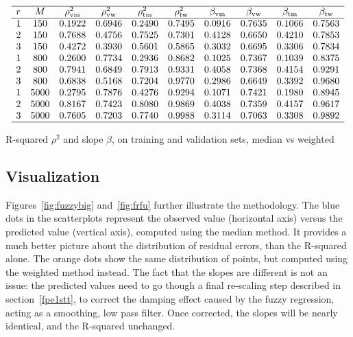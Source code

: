 \documentclass[oneside,10pt]{book}
\begin{document}
\begin{table}[H]
\small
\[
\begin{array}{lccccccccc}
\hline
  r & M & \rho^2_{\text{vm}}  & \rho^2_{\text{vw}} & \rho^2_{\text{tm}}  & \rho^2_{\text{tw}} & \beta_{\text{vm}} & \beta_{\text{vw}} & \beta_{\text{tm}} & \beta_{\text{tw}}\\
\hline
1	&	150	&	0.1922	&	0.6946	&	0.2490	&	0.7495	 & 0.0916 & 0.7635 & 0.1066 & 0.7563\\
2	&	150	&	0.7688	&	0.4756	&	0.7525	&	0.7301	 & 0.4128 & 0.6650 & 0.4210 & 0.7853\\
3	&	150	&	0.4272	&	0.3930	&	0.5601	&	0.5865	 & 0.3032 & 0.6695 & 0.3306 & 0.7834\\
1	&	800	&	0.2600	&	0.7734	&	0.2936	&	0.8682	 & 0.1025 & 0.7367 & 0.1039 & 0.8375\\
2	&	800	&	0.7941	&	0.6849	&	0.7913	&	0.9331	 & 0.4058 & 0.7368 & 0.4154 & 0.9291\\
3	&	800	&	0.6838	&	0.5168	&	0.7204	&	0.9770	 & 0.2986 & 0.6649 & 0.3392 & 0.9680\\
1	&	5000	&	0.2795	&	0.7876	&	0.4276	&	0.9294	 & 0.1071 & 0.7421 & 0.1980 & 0.8945\\
2	&	5000	&	0.8167	&	0.7423	&	0.8080	&	0.9869	 & 0.4038 & 0.7359 & 0.4157 & 0.9617\\
3	&	5000	&	0.7605	&	0.7203	&	0.7740	&	0.9988	 & 0.3114 & 0.7063 & 0.3308 & 0.9892\\
\hline
\end{array}
\]
\caption{\label{futabcorrel}R-squared $\rho^2$ and slope $\beta$, on training and validation sets, median vs weighted}
\end{table}

\subsection{Visualization}

Figures~\ref{fig:fuzzybig} and~\ref{fig:frfu} further illustrate the methodology. The blue dots in the scatterplots represent the observed value (horizontal axis) versus the predicted value (vertical axis), computed using the median method. It provides a much better picture about the distribution of residual errors, than the R-squared alone. The orange dots show the same distribution of points, but computed using the weighted method instead. The fact that the slopes are different is not an issue: the predicted values need to go though a 
final re-scaling step described in section~\ref{fpe1stt}, to correct the damping effect caused by the fuzzy regression, acting as a smoothing, low pass filter. Once corrected, the slopes will be nearly identical, and the R-squared unchanged.
\end{document}
